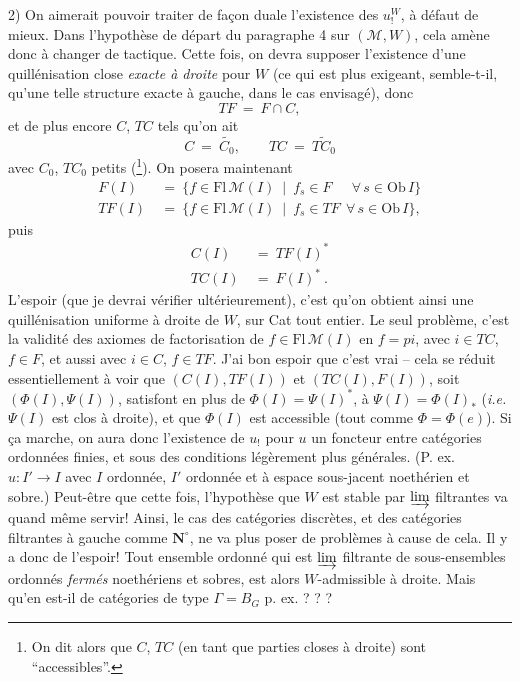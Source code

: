 \documentclass[11pt]{article}
\newcommand{\printedpage}[1]{\marginpar{\footnotesize p.~#1}}
\newcommand{\msp}[1]{\marginpar{\footnotesize [#1]}}
\newcommand{\M}{\mathcal{M}}
\newcommand{\Ob}{\mathrm{Ob}\,}
\newcommand{\Fl}{\mathrm{Fl}\,}
\begin{document}
2) On aimerait pouvoir traiter de façon duale l'existence des $u_!^W$, à défaut de mieux. Dans l'hypothèse de départ du paragraphe 4 sur $(\M,W)$, cela amène donc à changer de tactique. Cette fois, on devra supposer l'existence d'une quillénisation close \textit{exacte à droite} pour $W$ (ce qui est plus exigeant, semble-t-il, qu'une telle structure exacte à gauche, dans le cas envisagé), donc
\[
TF \ = \ F \cap C,
\]
\msp{page 75}
et de plus encore $C$, $TC$ tels qu'on ait
\[
C \ = \ \widetilde{C_0}, \qquad TC \ = \ \widetilde{TC_0}
\]
avec $C_0$, $TC_0$ petits (\footnote[38]{On dit alors que $C$, $TC$ (en tant que parties closes à droite) sont “accessibles”.}). On posera maintenant
\[
\begin{aligned}
F(I) \ &= \ \{f \in \Fl \M(I) \ \mid \ f_s \in F \quad\ \ \forall\, s \in \Ob I\}\\
TF(I) \ &= \ \{f \in \Fl \M(I) \ \mid \ f_s \in TF \ \ \forall\, s \in \Ob I\},
\end{aligned}
\]
puis
\[
\begin{aligned}
C(I) \ &= \ TF(I)^*\\
TC(I) \ &= \ F(I)^*\ .
\end{aligned}
\]
L'espoir (que je devrai vérifier ultérieurement), c'est qu'on obtient ainsi une quillénisation uniforme à droite de $W$, sur Cat tout entier. Le seul problème, c'est la validité des axiomes de factorisation de $f \in \Fl \M(I)$ en $f = pi$, avec $i \in TC$, $f \in F$, et aussi avec $i \in C$, $f \in TF$. %
J'ai bon espoir que c'est vrai -- cela se réduit essentiellement à voir que $(C(I),TF(I))$ et $(TC(I),F(I))$, soit $(\Phi(I),\Psi(I))$, satisfont en plus de $\Phi(I) = \Psi(I)^*$, à $\Psi(I) = \Phi(I)_*$ (\textit{i.e.} $\Psi(I)$ est clos à droite), et que $\Phi(I)$ est accessible (tout comme $\Phi = \Phi(e)$). Si ça marche, on aura donc l'existence
\printedpage{42}
\msp{page 76}
de $u_!$ pour $u$ un foncteur entre catégories ordonnées finies, et sous des conditions légèrement plus générales. (P. ex. $u : I' \longrightarrow I$ avec $I$ ordonnée, $I'$ ordonnée et à espace sous-jacent noethérien et sobre.) Peut-être que cette fois, l'hypothèse que $W$ est stable par $\varinjlim$ filtrantes va quand même servir! Ainsi, le cas des catégories discrètes, et des catégories filtrantes à gauche comme $\mathbf{N}^\circ$, ne va plus poser de problèmes à cause de cela. Il y a donc de l'espoir! Tout ensemble ordonné qui est $\varinjlim$ filtrante de sous-ensembles ordonnés \textit{fermés} noethériens et sobres, est alors $W$-admissible à droite. Mais qu'en est-il de catégories de type $\Gamma = B_G$ p. ex. ? ? ?
\end{document}

